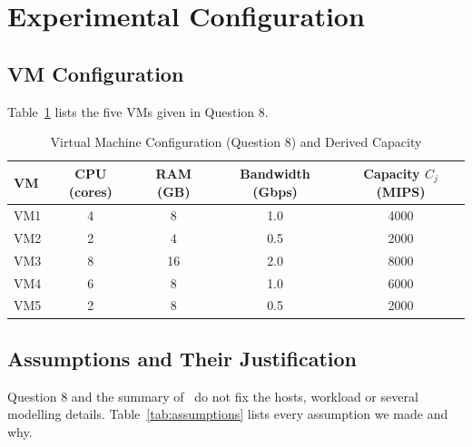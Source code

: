 \documentclass[journal,onecolumn,12pt]{IEEEtran}
\begin{document}
\section{Experimental Configuration}\label{sec:config}

\subsection{VM Configuration}
Table~\ref{tab:vms} lists the five VMs given in Question 8.

\begin{table}[!htbp]
\caption{Virtual Machine Configuration (Question 8) and Derived Capacity}
\label{tab:vms}
\centering
\begin{tabular}{lcccc}
\toprule
VM & CPU (cores) & RAM (GB) & Bandwidth (Gbps) & Capacity $C_j$ (MIPS) \\
\midrule
VM1 & 4 & 8 & 1.0 & 4000 \\
VM2 & 2 & 4 & 0.5 & 2000 \\
VM3 & 8 & 16 & 2.0 & 8000 \\
VM4 & 6 & 8 & 1.0 & 6000 \\
VM5 & 2 & 8 & 0.5 & 2000 \\
\bottomrule
\end{tabular}
\end{table}

\subsection{Assumptions and Their Justification}
Question 8 and the summary of~\cite{dehury} do not fix the hosts, workload or several modelling details. Table~\ref{tab:assumptions} lists every assumption we made and why.
\end{document}
